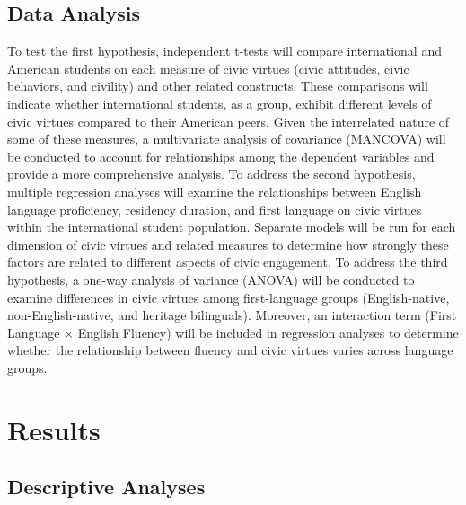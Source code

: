 \documentclass[
  man,
  floatsintext,
  longtable,
  nolmodern,
  notxfonts,
  notimes,
  colorlinks=true,linkcolor=blue,citecolor=blue,urlcolor=blue]{apa7}
\begin{document}
\subsection{Data Analysis}\label{data-analysis}

To test the first hypothesis, independent t-tests will compare
international and American students on each measure of civic virtues
(civic attitudes, civic behaviors, and civility) and other related
constructs. These comparisons will indicate whether international
students, as a group, exhibit different levels of civic virtues compared
to their American peers. Given the interrelated nature of some of these
measures, a multivariate analysis of covariance (MANCOVA) will be
conducted to account for relationships among the dependent variables and
provide a more comprehensive analysis. To address the second hypothesis,
multiple regression analyses will examine the relationships between
English language proficiency, residency duration, and first language on
civic virtues within the international student population. Separate
models will be run for each dimension of civic virtues and related
measures to determine how strongly these factors are related to
different aspects of civic engagement. To address the third hypothesis,
a one-way analysis of variance (ANOVA) will be conducted to examine
differences in civic virtues among first-language groups
(English-native, non-English-native, and heritage bilinguals). Moreover,
an interaction term (First Language × English Fluency) will be included
in regression analyses to determine whether the relationship between
fluency and civic virtues varies across language groups.

\section{Results}\label{results}

\subsection{Descriptive Analyses}\label{descriptive-analyses}
\end{document}
